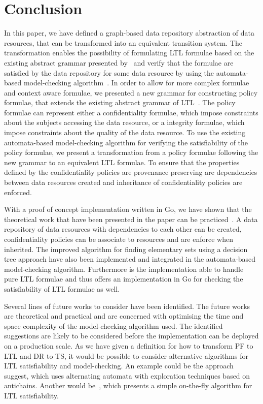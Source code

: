 \section{Conclusion}
In this paper, we have defined a graph-based data repository abstraction of data resources, that can be transformed into an equivalent transition system. The transformation enables the possibility of formulating LTL formulae based on the existing abstract grammar presented by~\cite{baier2008principles} and verify that the formulae are satisfied by the data repository for some data resource by using the automata-based model-checking algorithm~\cite{baier2008principles}. In order to allow for more complex formulae and context aware formulae, we presented a new grammar for constructing policy formulae, that extends the existing abstract grammar of LTL~\cite{baier2008principles}. The policy formulae can represent either a confidentiality formulae, which impose constraints about the subjects accessing the data resource, or a integrity formulae, which impose constraints about the quality of the data resource. To use the existing automata-based model-checking algorithm for verifying the satisfiability of the policy formulae, we present a transformation from a policy formulae following the new grammar to an equivalent LTL formulae. To ensure that the properties defined by the confidentiality policies are provenance preserving are dependencies between data resources created and inheritance of confidentiality policies are enforced.

With a proof of concept implementation written in Go, we have shown that the theoretical work that have been presented in the paper can be practiced~\cite{}. A data repository of data resources with dependencies to each other can be created, confidentiality policies can be associate to resources and are enforce when inherited. The improved algorithm for finding elementary sets using a decision tree approach have also been implemented and integrated in the automata-based model-checking algorithm. Furthermore is the implementation able to handle pure LTL formulae and thus offers an implementation in Go for checking the satisfiability of LTL formulae as well.

Several lines of future works to consider have been identified. The future works are theoretical and practical and are concerned with optimising the time and space complexity of the model-checking algorithm used. The identified suggestions are likely to be considered before the implementation can be deployed on a production scale. As we have given a definition for how to transform PF to LTL and DR to TS, it would be possible to consider alternative algorithms for LTL satisfiability and model-checking. An example could be the approach~\cite{de2008antichains} suggest, which uses alternating automata  with exploration techniques based on antichains. Another would be~\cite{gerth1995simple}, which presents a simple on-the-fly algorithm for LTL satisfiability.
